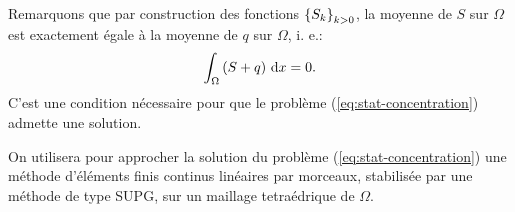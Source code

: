 Remarquons que par construction des fonctions $\left\{ S_k \right\}_{k>0}$,
la moyenne de $S$ sur $\Omega$ est exactement égale à la moyenne de
$q$ sur $\Omega$, i. e.:
\begin{equation}
  \int_\Omega \left( S + q \right)\,\mathrm dx = 0.
\end{equation}
C'est une condition nécessaire pour que le problème
(\ref{eq:stat-concentration}) admette une solution.

On utilisera pour approcher la solution du problème
(\ref{eq:stat-concentration}) une méthode d'éléments finis continus
linéaires par morceaux, stabilisée par une méthode de type SUPG, sur
un maillage tetraédrique de $\Omega$.
